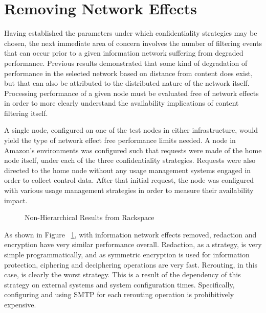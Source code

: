 \section{Removing Network Effects}
Having established the parameters under which confidentiality strategies may be chosen, the next immediate area of concern involves the number of filtering events that can occur prior to a given information network suffering from degraded performance.  Previous results demonstrated that some kind of degradation of performance in the selected network based on distance from content does exist, but that can also be attributed to the distributed nature of the network itself.  Processing performance of a given node must be evaluated free of network effects in order to more clearly understand the availability implications of content filtering itself.

A single node, configured on one of the test nodes in either infrastructure, would yield the type of network effect free performance limits needed.  A node in Amazon's environments was configured such that requests were made of the home node itself, under each of the three confidentiality strategies.  Requests were also directed to the home node without any usage management systems engaged in order to collect control data.  After that initial request, the node was configured with various usage management strategies in order to measure their availability impact.


\begin{figure}[htbp]
\begin{minipage}[b]{0.5\linewidth}
\centering
{}
\end{minipage}
\begin{minipage}[b]{0.5\linewidth}
\centering
{}
\end{minipage}
\caption{Non-Hierarchical Results from Rackspace}
\label{fig:model:single-node-results}
\end{figure}

As shown in Figure ~\ref{fig:model:single-node-results}, with information network effects removed, redaction and encryption have very similar performance overall.  Redaction, as a strategy, is very simple programmatically, and as symmetric encryption is used for information protection, ciphering and deciphering operations are very fast.  Rerouting, in this case, is clearly the worst strategy.  This is a result of the dependency of this strategy on external systems and system configuration times.  Specifically, configuring and using SMTP for each rerouting operation is prohibitively expensive.